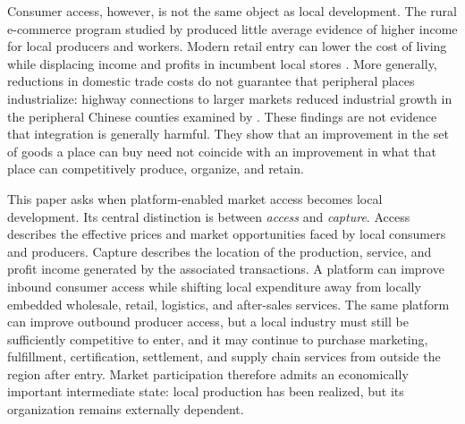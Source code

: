 \documentclass[11pt]{article}
\theoremstyle{definition}
\theoremstyle{remark}
\begin{document}
Consumer access, however, is not the same object as local development.  The
rural e-commerce program studied by \citet{CoutureFaberGuLiu2021} produced
little average evidence of higher income for local producers and workers.
Modern retail entry can lower the cost of living while displacing income and
profits in incumbent local stores \citep{AtkinFaberGonzalezNavarro2018}.
More generally, reductions in domestic trade costs do not guarantee that
peripheral places industrialize: highway connections to larger markets
reduced industrial growth in the peripheral Chinese counties examined by
\citet{Faber2014}.  These findings are not evidence that integration is
generally harmful.  They show that an improvement in the set of goods a place
can buy need not coincide with an improvement in what that place can
competitively produce, organize, and retain.

This paper asks when platform-enabled market access becomes local development.
Its central distinction is between \emph{access} and \emph{capture}.  Access
describes the effective prices and market opportunities faced by local
consumers and producers.  Capture describes the location of the production,
service, and profit income generated by the associated transactions.  A
platform can improve inbound consumer access while shifting local expenditure
away from locally embedded wholesale, retail, logistics, and after-sales
services.  The same platform can improve outbound producer access, but a local
industry must still be sufficiently competitive to enter, and it may continue
to purchase marketing, fulfillment, certification, settlement, and supply
chain services from outside the region after entry.  Market participation
therefore admits an economically important intermediate state: local
production has been realized, but its organization remains externally
dependent.
\end{document}
